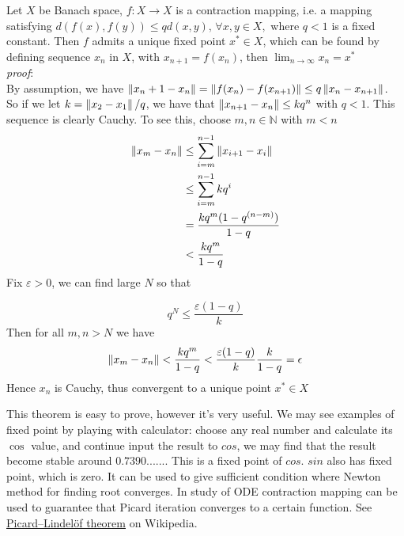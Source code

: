 \begin{theorem}\rm \nextline
	Let $X$ be Banach space, $f:X\xrightarrow{}X$ is a contraction mapping, i.e. a mapping satisfying
	$
		d(f(x),f(y))\leq qd(x,y),\,\forall x,y\in X,
	$
	where $q<1$ is a fixed constant.
	Then $f$ admits a unique fixed point $x^*\in X$, which can be found by
	defining sequence ${x_n}$ in $X$, with $x_{n+1}=f(x_n)$, then $\lim_{n\to \infty}x_n=x^*$\\
	\textit{proof}:\\
	By assumption, we have $\left\|{x_n+1-x_n}\right\|=\left\|{f(x_n)-f(x_{n+1})}\right\|\leq q\left\|{x_n-x_{n+1}}\right\|$.\\
	So if we let $k=\left\|{x_2-x_1}\right\|/q$, we have that $\left\|{x_{n+1}-x_n}\right\|\leq k q^n$ with $q<1$.
	This sequence is clearly Cauchy. To see this, choose $m,n\in\mathbb{N}$ with $m<n$
	\begin{equation}
		\begin{split}
			\left\|{x_m-x_n}\right\|&\leq\sum_{i=m}^{n-1} \left\|{x_{i+1}-x_i}\right\|\\
			&\leq\sum_{i=m}^{n-1} k q^i\\
			&=\frac{kq^{m} (1-q^{(n-m)})}{1-q}\\
			&< \frac{kq^{m}}{1-q}\\
		\end{split}
	\end{equation}
	Fix $\varepsilon>0$, we can find large  $N$ so that

	$$
		q^N\leq \frac{\varepsilon(1-q)}{k}
	$$
	Then for all $m,n>N$ we have
	$$
		\left\|{x_m-x_n}\right\|<\frac{kq^{m}}{1-q}<\frac{\varepsilon(1-q)}{k}\frac{k}{1-q}=\epsilon
	$$
	Hence ${x_n}$ is Cauchy, thus convergent to a unique point $x^*\in X$
\end{theorem}

\begin{remark}\rm\nextline
	This theorem is easy to prove, however it's very useful. We may see examples of fixed point by playing with calculator: choose any real number and calculate its $\cos$ value, and continue input the result to $cos$, we may find that the result become stable around $0.7390......$. This is a fixed point of $cos$. $sin$ also has fixed point, which is zero. It can be used to give sufficient condition where Newton method for finding root converges. In study of ODE contraction mapping can be used to guarantee that Picard iteration converges to a certain function. See \href{https://en.wikipedia.org/wiki/Picard–Lindelöf_theorem}{Picard–Lindelöf theorem} on Wikipedia.
\end{remark}

